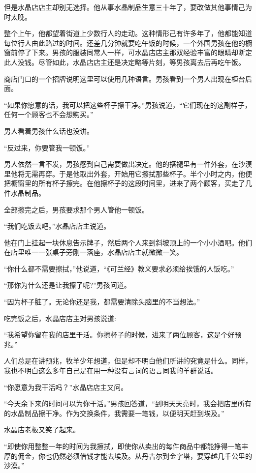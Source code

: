 \documentclass[twoside,openany]{book}
\begin{document}
但是水晶店店主却别无选择。他从事水晶制品生意三十年了，要改做其他事情己为时太晚。

整个上午，他都望着街道上少数行人的走动。这种情形己有许多年了，他都能知道每位行人由此路过的时间。还差几分钟就要吃午饭的时候，一个外国男孩在他的橱窗前停了下来。男孩的服装同常人一样，可水晶店店主那双经验丰富的眼睛却断定此人没钱。尽管如此，水晶店店主还是决定略等片刻，等男孩离去后再吃午饭。

商店门口的一个招牌说明这里可以使用几种语言。男孩看到一个男人出现在柜台后面。

“如果你愿意的话，我可以把这些杯子擦干净。”男孩说道，“它们现在的这副样子，任何一个顾客也不会想购买。”

男人看着男孩什么话也没讲。

“反过来，你要管我一顿饭。”

男人依然一言不发，男孩感到自己需要做出决定。他的搭褪里有一件外套，在沙漠里他将无需再穿。于是他取出外套，开始用它擦拭那些杯子。半个小时之内，他便把橱窗里的所有杯子擦完。在他擦杯子的这段时间里，进来了两个顾客，买走了几件水晶制品。

全部擦完之后，男孩要求那个男人管他一顿饭。

“我们吃饭去吧。”水晶店店主说道。

他在门上挂起一块休息告示牌子，然后两个人来到斜坡顶上的一个小小酒吧。他们在店里唯一一张桌子旁刚一落座，水晶店店主就微微一笑。

“你什么都不需要擦拭，”他说道，“《可兰经》教义要求必须给挨饿的人饭吃。”

“那你为什么还是让我擦了呢?”男孩问道。

“因为杯子脏了。无论你还是我，都需要清除头脑里的不当想法。”

吃完饭之后，水晶店店主对男孩说道:

“我希望你留在我的店里干活。你擦杯子的时候，进来了两位顾客，这是个好预兆。”

人们总是在讲预兆，牧羊少年想道，但是却不明白他们所讲的究竟是什么。同样，我也不明白这么多年自己是在用一种没有言词的语言同我的羊群说话。

“你愿意为我干活吗？”水晶店店主又问。

“今天余下来的时间可以为你干活。”男孩回答道，“到明天天亮时，我会把店里所有的水晶制品擦干净。作为交换条件，我需要一笔钱，以便明天赶到埃及。”

水晶店老板又笑了起来。

“即使你用整整一年的时间为我擦拭，即使你从卖出的每件商品中都能挣得一笔丰厚的佣金，你也仍然必须借钱才能去埃及。从丹吉尔到金字塔，要穿越几千公里的沙漠。”
\end{document}

